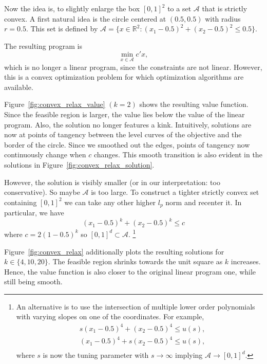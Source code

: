 \documentclass[12pt,a4paper,english]{article} %
\numberwithin{equation}{section}
\theoremstyle{definition}
\theoremstyle{remark}
\theoremstyle{plain}
\begin{document}
Now the idea is, to slightly enlarge the box $[0,1]^2$ to a set $\mathcal{A}$ that is strictly convex.
A first natural idea is the circle centered at $(0.5, 0.5)$ with radius $r=0.5$.
This set is defined by $\mathcal{A} = \{x \in \mathbb{R}^2: (x_1 - 0.5)^2 + (x_2 - 0.5)^2 \leq 0.5\}$.

The resulting program is
\begin{equation}
	\min_{x\in\mathcal{A}} c'x,
\end{equation}
which is no longer a linear program, since the constraints are not linear.
However, this is a convex optimization problem for which optimization algorithms are available.

Figure~\ref{fig:convex_relax_value} $(k=2)$ shows the resulting value function.
Since the feasible region is larger, the value lies below the value of the linear program.
Also, the solution no longer features a kink.
Intuitively, solutions are now at points of tangency between the level curves of the objective and the border of the circle.
Since we smoothed out the edges, points of tangency now continuously change when $c$ changes.
This smooth transition is also evident in the solutions in Figure~\ref{fig:convex_relax_solution}.

However, the solution is visibly smaller (or in our interpretation: too conservative).
So maybe $\mathcal{A}$ is too large.
To construct a tighter strictly convex set containing $[0,1]^2$ we can take any other higher $l_p$ norm and recenter it.
In particular, we have
\begin{equation*}
	(x_1-0.5)^k + (x_2-0.5)^k \leq c
\end{equation*}
where $c = 2(1-0.5)^k$ so $[0,1]^d \subset \mathcal{A}$.
\footnote{An alternative is to use the intersection of multiple lower order polynomials with varying slopes on one of the coordinates. For example,
\begin{align}
	& s(x_1 - 0.5)^4 + (x_2 - 0.5)^4 \leq u(s), \\
	& (x_1 - 0.5)^4 + s(x_2 - 0.5)^4 \leq u(s), \\
\end{align}
where $s$ is now the tuning parameter with $s\to\infty$ implying $\mathcal{A} \to [0,1]^d$.}

Figure~\ref{fig:convex_relax} additionally plots the resulting solutions for $k\in\{4, 10, 20\}$.
The feasible region shrinks towards the unit square as $k$ increases.
Hence, the value function is also closer to the original linear program one, while still being smooth.
\end{document}
